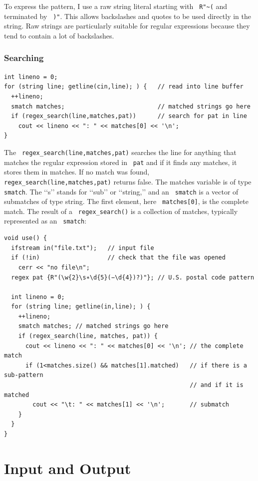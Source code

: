 \documentclass[11pt]{article}
\let\OldTexttt\texttt
\renewcommand{\texttt}[1]{\OldTexttt{\color{MidnightBlue} #1}}
\begin{document}
To express the pattern, I use a raw string literal starting with \texttt{R"\textasciitilde{}(} and terminated by \texttt{)"}. This
allows backslashes and quotes to be used directly in the string. Raw strings are particularly
suitable for regular expressions because they tend to contain a lot of backslashes.
\subsubsection{Searching}
\label{sec:orgd6e9e1b}
\begin{verbatim}
int lineno = 0;
for (string line; getline(cin,line); ) {   // read into line buffer
  ++lineno;
  smatch matches;                          // matched strings go here
  if (regex_search(line,matches,pat))      // search for pat in line
    cout << lineno << ": " << matches[0] << '\n';
}
\end{verbatim}
The \texttt{regex\_search(line,matches,pat)} searches the line for anything that matches the regular
expression stored in \texttt{pat} and if it finds any matches, it stores them in matches. If no match was
found, \texttt{regex\_search(line,matches,pat)} returns false. The matches variable is of type \texttt{smatch}. The
‘‘s’’ stands for ‘‘sub’’ or ‘‘string,’’ and an \texttt{smatch} is a vector of submatches of type string.
The first element, here \texttt{matches[0]}, is the complete match. The result of a \texttt{regex\_search()} is a
collection of matches, typically represented as an \texttt{smatch}:
\begin{verbatim}
void use() {
  ifstream in("file.txt");   // input file
  if (!in)                   // check that the file was opened
    cerr << "no file\n";
  regex pat {R"(\w{2}\s∗\d{5}(−\d{4})?)"}; // U.S. postal code pattern
                                           
  int lineno = 0;
  for (string line; getline(in,line); ) {
    ++lineno;
    smatch matches; // matched strings go here
    if (regex_search(line, matches, pat)) {
      cout << lineno << ": " << matches[0] << '\n'; // the complete match
      if (1<matches.size() && matches[1].matched)   // if there is a sub-pattern
                                                    // and if it is matched
        cout << "\t: " << matches[1] << '\n';       // submatch
    }
  }
}
\end{verbatim}

\section{Input and Output}
\label{sec:org19f7863}
\end{document}
